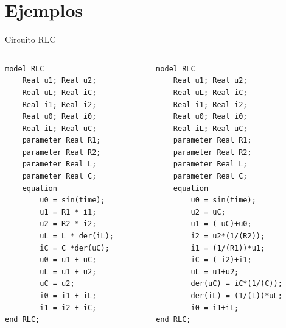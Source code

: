\section{Ejemplos}

\begin{frame}[fragile]{Circuito RLC}
   \fontsize{8pt}{7.2}\selectfont
    \begin{columns}
        \begin{column}{0.5\textwidth}
        \begin{lstlisting}[language=Modelica]
model RLC
    Real u1; Real u2;
    Real uL; Real iC;
    Real i1; Real i2;
    Real u0; Real i0;
    Real iL; Real uC;
    parameter Real R1;
    parameter Real R2;
    parameter Real L;
    parameter Real C;
    equation
        u0 = sin(time);
        u1 = R1 * i1;
        u2 = R2 * i2;
        uL = L * der(iL);
        iC = C *der(uC);
        u0 = u1 + uC;
        uL = u1 + u2;
        uC = u2;
        i0 = i1 + iL;
        i1 = i2 + iC;
end RLC;
        \end{lstlisting}
        \end{column}
        \begin{column}{0.5\textwidth}
        \begin{lstlisting}[language=Modelica]
model RLC
    Real u1; Real u2;
    Real uL; Real iC;
    Real i1; Real i2;
    Real u0; Real i0;
    Real iL; Real uC;
    parameter Real R1;
    parameter Real R2;
    parameter Real L;
    parameter Real C;
    equation
        u0 = sin(time);
        u2 = uC;
        u1 = (-uC)+u0;
        i2 = u2*(1/(R2));
        i1 = (1/(R1))*u1;
        iC = (-i2)+i1;
        uL = u1+u2;
        der(uC) = iC*(1/(C));
        der(iL) = (1/(L))*uL;
        i0 = i1+iL;
end RLC;
        \end{lstlisting}
        \end{column}
    \end{columns}
\end{frame}

